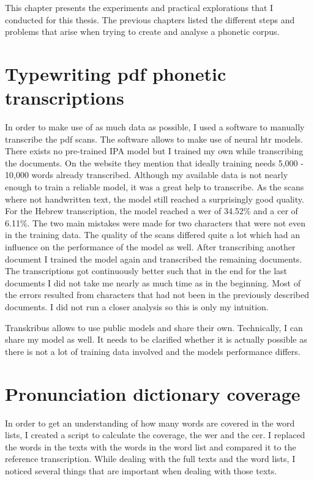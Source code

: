 
\label{chap:exp}
This chapter presents the experiments and practical explorations that I conducted for this thesis. The previous chapters listed the different steps and problems that arise when trying to create and analyse a phonetic corpus. 

\section{Typewriting pdf phonetic transcriptions}
In order to make use of as much data as possible, I used a software to manually transcribe the pdf scans. The software allows to make use of neural \ac{htr} models. There exists no pre-trained IPA model but I trained my own while transcribing the documents. On the website they mention that ideally training needs 5,000 - 10,000 words already transcribed. Although my available data is not nearly enough to train a reliable model, it was a great help to transcribe. As the scans where not handwritten text, the model still reached a surprisingly good quality. For the Hebrew transcription, the model reached a \ac{wer} of 34.52\% and a \ac{cer} of 6.11\%. The two main mistakes were made for two characters that were not even in the training data. The quality of the scans differed quite a lot which had an influence on the performance of the model as well. After transcribing another document I trained the model again and transcribed the remaining documents. The transcriptions got continuously better such that in the end for the last documents I did not take me nearly as much time as in the beginning. Most of the errors resulted from characters that had not been in the previously described documents. I did not run a closer analysis so this is only my intuition.

Transkribus allows to use public models and share their own. Technically, I can share my model as well. It needs to be clarified whether it is  actually possible as there is not a lot of training data involved and the models performance differs.


\section{Pronunciation dictionary coverage}
In order to get an understanding of how many words are covered in the word lists, I created a script to calculate the coverage, the \ac{wer} and the \ac{cer}. I replaced the words in the texts with the words in the word list and compared it to the reference transcription. While dealing with the full texts and the word lists, I noticed several things that are important when dealing with those texts.

